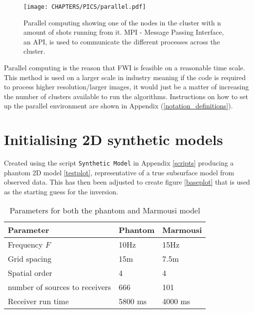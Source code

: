 \begin{figure}[!ht]
\begin{center}
 \texttt{[image: CHAPTERS/PICS/parallel.pdf]}
\caption[Parallel computing]{Parallel computing showing one of the nodes in the cluster with n amount of shots running from it. MPI - Message Passing Interface, an API, is used to communicate the different processes across the cluster.}
\label{parallel}
\end{center}
\end{figure}

Parallel computing is the reason that FWI is feasible on a reasonable time scale. This method is used on a larger scale in industry meaning if the code is required to process higher resolution/larger images, it would just be a matter of increasing the number of clusters available to run the algorithms. Instructions on how to set up the parallel environment are shown in Appendix (\ref{notation_definitions}). 

\section{Initialising 2D synthetic models}
Created using the script \verb|Synthetic Model| in Appendix \ref{scripts} producing a phantom 2D model \ref{testplot}, representative of a true subsurface model from observed data. This has then been adjusted to create figure \ref{baseplot} that is used as the starting guess for the inversion. 

\begin{table}[!h]
\centering
\caption{Parameters for both the phantom and Marmousi model}
\label{parameters}
\begin{tabular}{l|l|l}
\textbf{Parameter}             & \textbf{Phantom} & \textbf{Marmousi} \\ \hline
Frequency $F$                  & 10Hz             & 15Hz              \\
Grid spacing                   & 15m              & 7.5m              \\
Spatial order                  & 4                & 4                 \\
number of sources to receivers & 666              & 101               \\
Receiver run time              & 5800 ms          & 4000 ms          
\end{tabular}
\end{table}

